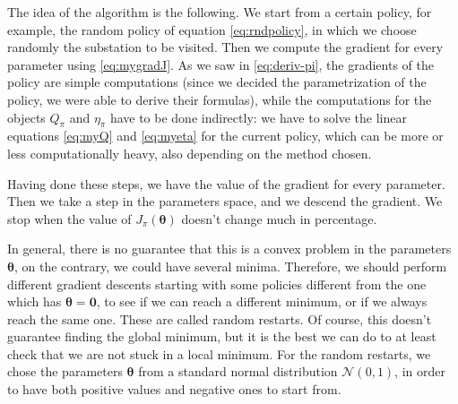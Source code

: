 The idea of the algorithm is the following. We start from a certain policy, for example, the random policy of equation \eqref{eq:rndpolicy}, in which we choose randomly the substation to be visited. Then we compute the gradient for every parameter using \eqref{eq:mygradJ}. As we saw in \eqref{eq:deriv-pi}, the gradients of the policy are simple computations (since we decided the parametrization of the policy, we were able to derive their formulas), while the computations for the objects $Q_\pi$ and $\eta_\pi$ have to be done indirectly: we have to solve the linear equations \eqref{eq:myQ} and \eqref{eq:myeta} for the current policy, which can be more or less computationally heavy, also depending on the method chosen.

Having done these steps, we have the value of the gradient for every parameter. Then we take a step in the parameters space, and we descend the gradient. We stop when the value of $J_\pi (\boldsymbol \theta)$ doesn't change much in percentage.

In general, there is no guarantee that this is a convex problem in the parameters $\boldsymbol \theta$, on the contrary, we could have several minima. Therefore, we should perform different gradient descents starting with some policies different from the one which has $\boldsymbol \theta = \mathbf 0$, to see if we can reach a different minimum, or if we always reach the same one. These are called random restarts. Of course, this doesn't guarantee finding the global minimum, but it is the best we can do to at least check that we are not stuck in a local minimum. For the random restarts, we chose the parameters $\boldsymbol \theta$ from a standard normal distribution $\mathcal N(0,1)$, in order to have both positive values and negative ones to start from.


